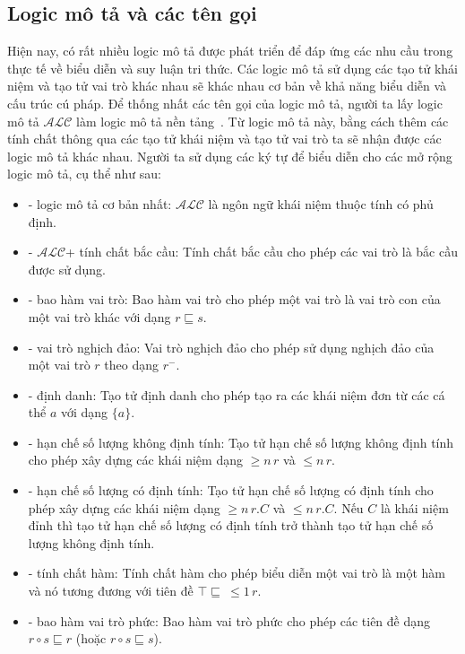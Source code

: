 \documentclass[12pt,a4paper,twoside]{report}
\newcommand{\mR}		{\mathcal{R}}
\newcommand{\mI}		{\mathcal{I}}
\newcommand{\mS}		{\mathcal{S}}
\newcommand{\mH}		{\mathcal{H}}
\newcommand{\mO}		{\mathcal{O}}
\newcommand{\mN}		{\mathcal{N}}
\newcommand{\mQ}		{\mathcal{Q}}
\newcommand{\mF}		{\mathcal{F}}
\newcommand{\ALC}		{$\mathcal{ALC}$\xspace}
\theoremstyle{definition}
\begin{document}
\subsection{Logic mô tả và các tên gọi}
Hiện nay, có rất nhiều logic mô tả được phát triển để đáp ứng các nhu cầu trong thực tế về biểu diễn và suy luận tri thức. Các logic mô tả sử dụng các tạo tử khái niệm và tạo tử vai trò khác nhau sẽ khác nhau cơ bản về khả năng biểu diễn và cấu trúc cú pháp. Để thống nhất các tên gọi của logic mô tả, người ta lấy logic mô tả \ALC làm logic mô tả nền tảng~\cite{Schmidt1991}. Từ logic mô tả này, bằng cách thêm các tính chất thông qua các tạo tử khái niệm và tạo tử vai trò ta sẽ nhận được các logic mô tả khác nhau. Người ta sử dụng các ký tự để biểu diễn cho các mở rộng logic mô tả, cụ thể như sau:
\begin{itemize}
  \item \fbox{\ALC} - logic mô tả cơ bản nhất: \ALC là ngôn ngữ khái niệm thuộc tính có phủ định.
  \item \fbox{$\mS$} - \ALC + tính chất bắc cầu: Tính chất bắc cầu cho phép các vai trò là bắc cầu được sử dụng.
  \item \fbox{$\mH$} - bao hàm vai trò: Bao hàm vai trò cho phép một vai trò là vai trò con của một vai trò khác với dạng $r \sqsubseteq s$.
  \item \fbox{$\mI$} - vai trò nghịch đảo: Vai trò nghịch đảo cho phép sử dụng nghịch đảo của một vai trò $r$ theo dạng $r^-$.
  \item \fbox{$\mO$} - định danh: Tạo tử định danh cho phép tạo ra các khái niệm đơn từ các cá thể $a$ với dạng $\{a\}$.
  
  \item \fbox{$\mN$} - hạn chế số lượng không định tính: Tạo tử hạn chế số lượng không định tính cho phép xây dựng các khái niệm dạng $\geq n\,r$ và $\leq n\,r$.
  \item \fbox{$\mQ$} - hạn chế số lượng có định tính: Tạo tử hạn chế số lượng có định tính cho phép xây dựng các khái niệm dạng $\geq n\,r.C$ và $\leq n\,r.C$. Nếu $C$ là khái niệm đỉnh thì tạo tử hạn chế số lượng có định tính trở thành tạo tử hạn chế số lượng không định tính.
  \item \fbox{$\mF$} - tính chất hàm: Tính chất hàm cho phép biểu diễn một vai trò là một hàm và nó tương đương với tiên đề $\top \sqsubseteq\ \leq 1\,r$.
  \item \fbox{$\mR$} - bao hàm vai trò phức: Bao hàm vai trò phức cho phép các tiên đề dạng $r \circ s \sqsubseteq r$ (hoặc $r \circ s \sqsubseteq s$).
\end{itemize}
\end{document}
